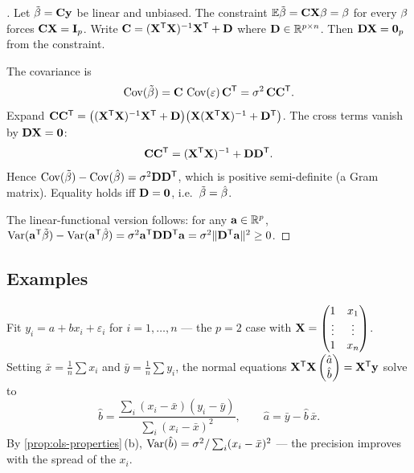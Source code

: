 \begin{proof}[]
Let $\tilde{\mathbf{\beta}} = \mathbf{C} \mathbf{y}$ be linear and unbiased.
The constraint
$\mathbb{E} \tilde{\mathbf{\beta}} = \mathbf{C} \mathbf{X} \mathbf{\beta} = \mathbf{\beta}$
for every $\mathbf{\beta}$ forces $\mathbf{C} \mathbf{X} = \mathbf{I}_p$. Write
$\mathbf{C} = (\mathbf{X}^{\mathsf{T}} \mathbf{X})^{-1} \mathbf{X}^{\mathsf{T}} + \mathbf{D}$ where
$\mathbf{D} \in \mathbb{R}^{p \times n}$. Then $\mathbf{D} \mathbf{X} = \mathbf{0}_p$ from
the constraint.

The covariance is
\[
  \operatorname{Cov}(\tilde{\mathbf{\beta}}) = \mathbf{C}\, \operatorname{Cov}(\mathbf{\varepsilon})\, \mathbf{C}^{\mathsf{T}} = \sigma^2\, \mathbf{C} \mathbf{C}^{\mathsf{T}}.
\]
Expand $\mathbf{C} \mathbf{C}^{\mathsf{T}} = \bigl((\mathbf{X}^{\mathsf{T}} \mathbf{X})^{-1} \mathbf{X}^{\mathsf{T}} + \mathbf{D}\bigr)\bigl(\mathbf{X} (\mathbf{X}^{\mathsf{T}} \mathbf{X})^{-1} + \mathbf{D}^{\mathsf{T}}\bigr)$.
The cross terms vanish by $\mathbf{D} \mathbf{X} = \mathbf{0}$:
\[
  \mathbf{C} \mathbf{C}^{\mathsf{T}} = (\mathbf{X}^{\mathsf{T}} \mathbf{X})^{-1} + \mathbf{D} \mathbf{D}^{\mathsf{T}}.
\]
Hence $\operatorname{Cov}(\tilde{\mathbf{\beta}}) - \operatorname{Cov}(\hat{\mathbf{\beta}}) = \sigma^2 \mathbf{D} \mathbf{D}^{\mathsf{T}}$,
which is positive semi-definite (a Gram matrix). Equality holds iff
$\mathbf{D} = \mathbf{0}$, i.e.\ $\tilde{\mathbf{\beta}} = \hat{\mathbf{\beta}}$.

The linear-functional version follows: for any
$\mathbf{a} \in \mathbb{R}^p$,
$\operatorname{Var}(\mathbf{a}^{\mathsf{T}} \tilde{\mathbf{\beta}}) - \operatorname{Var}(\mathbf{a}^{\mathsf{T}} \hat{\mathbf{\beta}}) = \sigma^2 \mathbf{a}^{\mathsf{T}} \mathbf{D} \mathbf{D}^{\mathsf{T}} \mathbf{a} = \sigma^2 \|\mathbf{D}^{\mathsf{T}} \mathbf{a}\|^2 \geq 0$.
\end{proof}

\subsection*{Examples}

\begin{example}
\label{ex:simple-linear-regression}
Fit $y_i = a + b x_i + \varepsilon_i$ for $i = 1, \dots, n$ — the
$p = 2$ case with
$\mathbf{X} = \begin{pmatrix} 1 & x_1 \\ \vdots & \vdots \\ 1 & x_n \end{pmatrix}$.
Setting $\bar x = \tfrac{1}{n}\sum x_i$ and $\bar y = \tfrac{1}{n}\sum y_i$,
the normal equations
$\mathbf{X}^{\mathsf{T}} \mathbf{X} \begin{pmatrix} \hat a \\ \hat b \end{pmatrix} = \mathbf{X}^{\mathsf{T}} \mathbf{y}$
solve to
\[
  \hat b = \frac{\sum_{i} (x_i - \bar x)(y_i - \bar y)}{\sum_{i} (x_i - \bar x)^2}, \qquad
  \hat a = \bar y - \hat b\, \bar x.
\]
By \cref{prop:ols-properties}\,(b),
$\operatorname{Var}(\hat b) = \sigma^2 / \sum_i (x_i - \bar x)^2$ — the precision
improves with the spread of the $x_i$.
\end{example}

